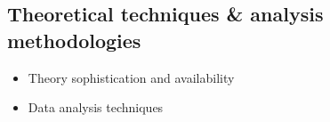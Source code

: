 \subsection{Theoretical techniques \& analysis methodologies}

\begin{itemize}
\item Theory sophistication and availability
\item Data analysis techniques

\end{itemize}